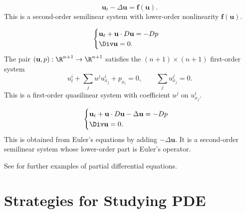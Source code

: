 \begin{example}
\label{ex:reaction-diffusion-system}
\leanok
$$\mathbf{u}_t - \Delta\mathbf{u} = \mathbf{f}(\mathbf{u}).$$
This is a second-order semilinear system with lower-order nonlinearity
$\mathbf{f}(\mathbf{u})$.
\end{example}

\begin{example}
\label{ex:euler-equations-incompressible-inviscid}
\leanok
$$\begin{cases}
\mathbf{u}_t + \mathbf{u} \cdot D\mathbf{u} = -D p \\
\Div \mathbf{u} = 0.
\end{cases}$$
The pair $(\mathbf{u},p):\R^{n+1}\to\R^{n+1}$ satisfies the $(n+1)\times(n+1)$ first-order system
$$u^i_t+\sum_j u^j u^i_{x_j}+p_{x_i}=0,\qquad \sum_j u^j_{x_j}=0.$$
This is a first-order quasilinear system with coefficient $u^j$ on
$u^i_{x_j}$.
\end{example}

\begin{example}
\label{ex:navier-stokes-equations-incompressible-viscous}
\leanok
$$\begin{cases}
\mathbf{u}_t + \mathbf{u} \cdot D\mathbf{u} - \Delta\mathbf{u} = -D p \\
\Div \mathbf{u} = 0.
\end{cases}$$
This is obtained from Euler's equations by adding $-\Delta\mathbf{u}$. It is a
second-order semilinear system whose lower-order part is Euler's operator.
\end{example}

See \cite{Zwillinger1984} for further examples of partial differential equations.
\section{Strategies for Studying PDE}
\label{sec:strategies-studying-pde}

